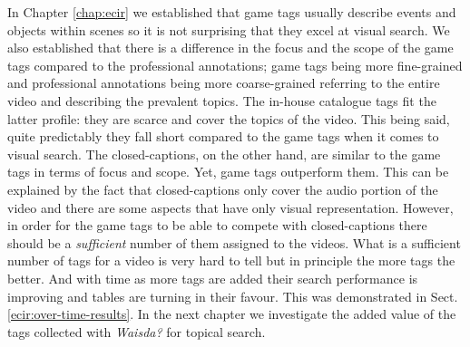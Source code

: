In Chapter \ref{chap:ecir} we established that game tags usually describe events and objects within scenes so it is not surprising that they excel at visual search. We also established that there is a difference in the focus and the scope of the game tags compared to the professional annotations; game tags being more fine-grained and professional annotations being more coarse-grained referring to the entire video and describing the prevalent topics. The in-house catalogue tags fit the latter profile: they are scarce and cover the topics of the video. This being said, quite predictably they fall short compared to the game tags when it comes to visual search. The closed-captions, on the other hand, are similar to the game tags in terms of focus and scope. Yet, game tags outperform them. This can be explained by the fact that closed-captions only cover the audio portion of the video and there are some aspects that have only visual representation. However, in order for the game tags to be able to compete with closed-captions there should be a \textit{sufficient} number of them assigned to the videos. What is a sufficient number of tags for a video is very hard to tell but in principle the more tags the better. And with time as more tags are added their search performance is improving and tables are turning in their favour. This was demonstrated in Sect. \ref{ecir:over-time-results}. In the next chapter we investigate the added value of the tags collected with \textit{Waisda?} for topical search.